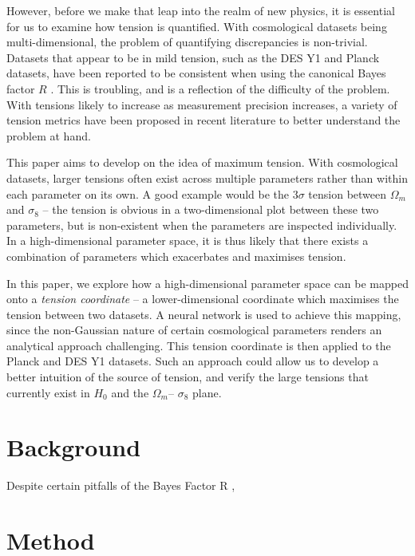 \documentclass[%
 reprint,
 amsmath,amssymb,
 aps,
]{revtex4-2}
\begin{document}
However, before we make that leap into the realm of new physics, it is essential for us to examine how tension is quantified. With cosmological datasets being multi-dimensional, the problem of quantifying discrepancies is non-trivial. Datasets that appear to be in mild tension, such as the DES Y1 and Planck datasets, have been reported to be consistent when using the canonical Bayes factor $R$ \cite{Handley2019}. This is troubling, and is a reflection of the difficulty of the problem. With tensions likely to increase as measurement precision increases, a variety of tension metrics have been proposed in recent literature \cite{Charnock2017} to better understand the problem at hand.

This paper aims to develop on the idea of maximum tension. With cosmological datasets, larger tensions often exist across multiple parameters rather than within each parameter on its own. A good example would be the $3 \sigma$ tension between $\Omega_m$ and $\sigma_8$ -- the tension is obvious in a two-dimensional plot between these two parameters, but is non-existent when the parameters are inspected individually. In a high-dimensional parameter space, it is thus likely that there exists a combination of parameters which exacerbates and maximises tension.

In this paper, we explore how a high-dimensional parameter space can be mapped onto a \textit{tension coordinate} -- a lower-dimensional coordinate which maximises the tension between two datasets. A neural network is used to achieve this mapping, since the non-Gaussian nature of certain cosmological parameters renders an analytical approach challenging. This tension coordinate is then applied to the Planck and DES Y1 datasets. Such an approach could allow us to develop a better intuition of the source of tension, and verify the large tensions that currently exist in $H_0$ and the $\Omega_m$-- $\sigma_8$ plane.


\section{Background}

Despite certain pitfalls \cite{Handley2019} of the Bayes Factor R \cite{Marshall2006}, 



\section{Method}
\end{document}
